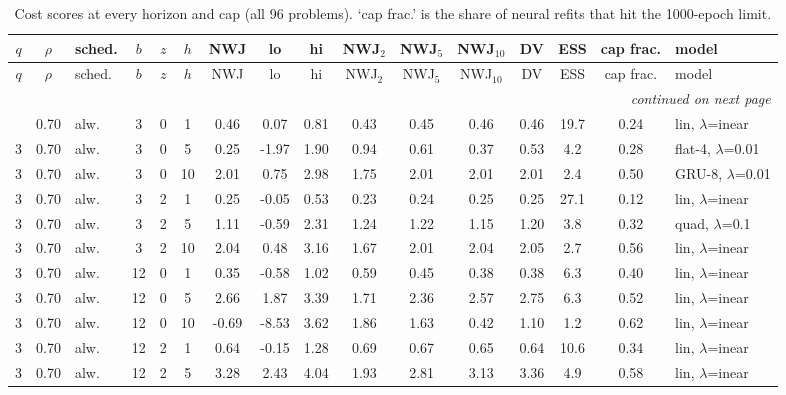 \documentclass[10pt]{article}
\begin{document}
\begin{scriptsize}
\setlength{\tabcolsep}{3pt}
\begin{longtable}{cclcc c ccc ccc c cc l}
\caption{Cost scores at every horizon and cap (all 96 problems). `cap frac.' is the share of neural refits that hit the 1000-epoch limit.}\label{tab:app-cost}\\
\toprule
$q$ & $\rho$ & sched. & $b$ & $z$ & $h$ & NWJ & lo & hi & NWJ$_2$ & NWJ$_5$ & NWJ$_{10}$ & DV & ESS & cap frac. & model \\
\midrule
\endfirsthead
\toprule
$q$ & $\rho$ & sched. & $b$ & $z$ & $h$ & NWJ & lo & hi & NWJ$_2$ & NWJ$_5$ & NWJ$_{10}$ & DV & ESS & cap frac. & model \\
\midrule
\endhead
\midrule
\multicolumn{16}{r}{\emph{continued on next page}}\\
\endfoot
\bottomrule
\endlastfoot
3 & 0.70 & alw. & 3 & 0 & 1 & 0.46 & 0.07 & 0.81 & 0.43 & 0.45 & 0.46 & 0.46 & 19.7 & 0.24 & lin, $\lambda$=inear \\
3 & 0.70 & alw. & 3 & 0 & 5 & 0.25 & -1.97 & 1.90 & 0.94 & 0.61 & 0.37 & 0.53 & 4.2 & 0.28 & flat-4, $\lambda$=0.01 \\
3 & 0.70 & alw. & 3 & 0 & 10 & 2.01 & 0.75 & 2.98 & 1.75 & 2.01 & 2.01 & 2.01 & 2.4 & 0.50 & GRU-8, $\lambda$=0.01 \\
3 & 0.70 & alw. & 3 & 2 & 1 & 0.25 & -0.05 & 0.53 & 0.23 & 0.24 & 0.25 & 0.25 & 27.1 & 0.12 & lin, $\lambda$=inear \\
3 & 0.70 & alw. & 3 & 2 & 5 & 1.11 & -0.59 & 2.31 & 1.24 & 1.22 & 1.15 & 1.20 & 3.8 & 0.32 & quad, $\lambda$=0.1 \\
3 & 0.70 & alw. & 3 & 2 & 10 & 2.04 & 0.48 & 3.16 & 1.67 & 2.01 & 2.04 & 2.05 & 2.7 & 0.56 & lin, $\lambda$=inear \\
3 & 0.70 & alw. & 12 & 0 & 1 & 0.35 & -0.58 & 1.02 & 0.59 & 0.45 & 0.38 & 0.38 & 6.3 & 0.40 & lin, $\lambda$=inear \\
3 & 0.70 & alw. & 12 & 0 & 5 & 2.66 & 1.87 & 3.39 & 1.71 & 2.36 & 2.57 & 2.75 & 6.3 & 0.52 & lin, $\lambda$=inear \\
3 & 0.70 & alw. & 12 & 0 & 10 & -0.69 & -8.53 & 3.62 & 1.86 & 1.63 & 0.42 & 1.10 & 1.2 & 0.62 & lin, $\lambda$=inear \\
3 & 0.70 & alw. & 12 & 2 & 1 & 0.64 & -0.15 & 1.28 & 0.69 & 0.67 & 0.65 & 0.64 & 10.6 & 0.34 & lin, $\lambda$=inear \\
3 & 0.70 & alw. & 12 & 2 & 5 & 3.28 & 2.43 & 4.04 & 1.93 & 2.81 & 3.13 & 3.36 & 4.9 & 0.58 & lin, $\lambda$=inear \\

\end{longtable}
\end{scriptsize}
\end{document}
